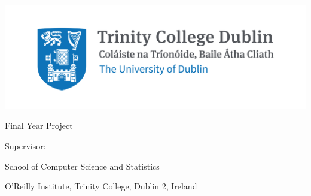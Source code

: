 \thispagestyle{empty}

{
  \centering

  \sffamily

  \vspace{50pt}

  \includegraphics{tcd/trinitycollege.jpg}

  \vspace{40pt}
  
  \textbf{\Large \emph \projecttitle}

  \vspace{30pt}

  \authorname

  \degreetitle

  Final Year Project \datenospace

  Supervisor: \supervisorname

  \vspace{130pt}

  \large{
    School of Computer Science and Statistics

    O'Reilly Institute, Trinity College, Dublin 2, Ireland
  }

}


